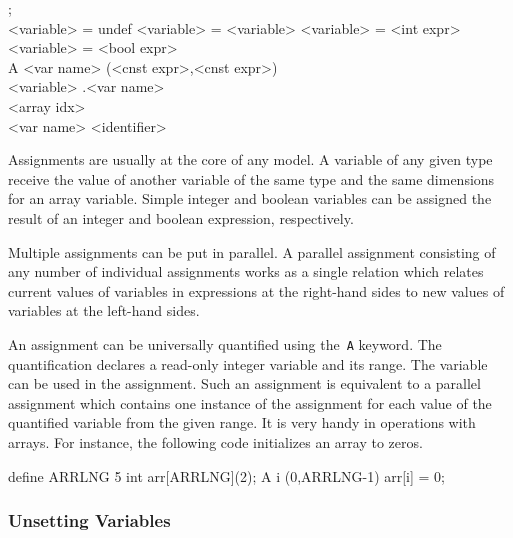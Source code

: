 \documentclass[a4paper,11pt,titlepage,english]{article}
\begin{document}
\begin{bnfgrammar}
[assignments] \is {};\\
[assignment] \is    {} <variable> = undef
    \or <variable> = <variable>
    \or {} <variable> = <int expr>
    \or {} <variable> = <bool expr>
    \\
[quantify] \is A <var name> (<cnst expr>,<cnst expr>)
    \\
<variable> 
    .<var name>
    \\
<array idx>  \\
<var name> \is <identifier> \\
\end{bnfgrammar}

Assignments are usually at the core of any model. A variable of any given
type receive the value of another variable of the same type and the
same dimensions for an array variable. Simple integer and boolean variables
can be assigned the result of an integer and boolean expression,
respectively. 

Multiple assignments can be put in parallel. A parallel assignment
consisting of any number of individual assignments works as a single
relation which relates current values of variables in expressions at the
right-hand sides to new values of variables at the left-hand sides. 

An assignment can be universally quantified using the~\verb|A| keyword. The
quantification declares a read-only integer variable and its range. The
variable can be used in the assignment. Such an assignment is equivalent to
a parallel assignment which contains one instance of the assignment for
each value of the quantified variable from the given range. It is very
handy in operations with arrays. For instance, the following code
initializes an array to zeros.
\begin{RemoplaSnippet}
    define ARRLNG 5
    int arr[ARRLNG](2);
    A i (0,ARRLNG-1) arr[i] = 0;
\end{RemoplaSnippet}

\subsubsection{Unsetting Variables}
\end{document}
